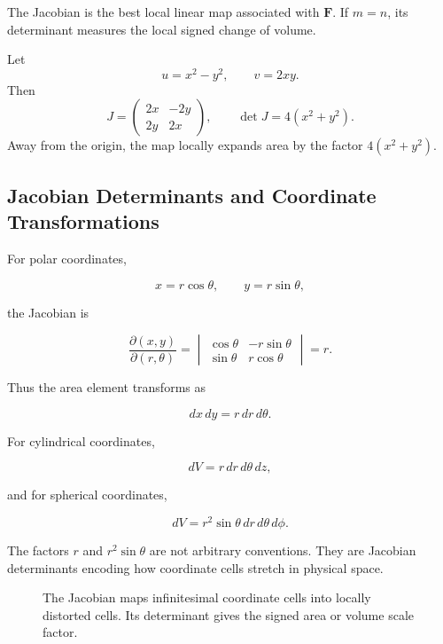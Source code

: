 The Jacobian is the best local linear map associated with $\mathbf F$. If $m=n$, its determinant measures the local signed change of volume.

\begin{bookexample}
Let
\[
u=x^2-y^2,
\qquad
v=2xy.
\]
Then
\[
J
=
\begin{pmatrix}
2x & -2y\\
2y & 2x
\end{pmatrix},
\qquad
\det J=4(x^2+y^2).
\]
Away from the origin, the map locally expands area by the factor $4(x^2+y^2)$.
\end{bookexample}

\subsection{Jacobian Determinants and Coordinate Transformations}

For polar coordinates,

\[
x=r\cos\theta,
\qquad
y=r\sin\theta,
\]

the Jacobian is

\[
\frac{\partial(x,y)}{\partial(r,\theta)}
=
\begin{vmatrix}
\cos\theta & -r\sin\theta\\
\sin\theta & r\cos\theta
\end{vmatrix}
=r.
\]

Thus the area element transforms as

\begin{equation}
\boxed{dx\,dy=r\,dr\,d\theta.}
\label{eq:polar-area-element}
\end{equation}

For cylindrical coordinates,

\[
dV=r\,dr\,d\theta\,dz,
\]

and for spherical coordinates,

\begin{equation}
\boxed{
dV=r^2\sin\theta\,dr\,d\theta\,d\phi.
}
\label{eq:spherical-volume-element}
\end{equation}

The factors $r$ and $r^2\sin\theta$ are not arbitrary conventions. They are Jacobian determinants encoding how coordinate cells stretch in physical space.

\begin{figure}[htbp]
\centering
{}
\caption{The Jacobian maps infinitesimal coordinate cells into locally distorted cells. Its determinant gives the signed area or volume scale factor.}
\label{fig:jacobian-deformation}
\end{figure}

